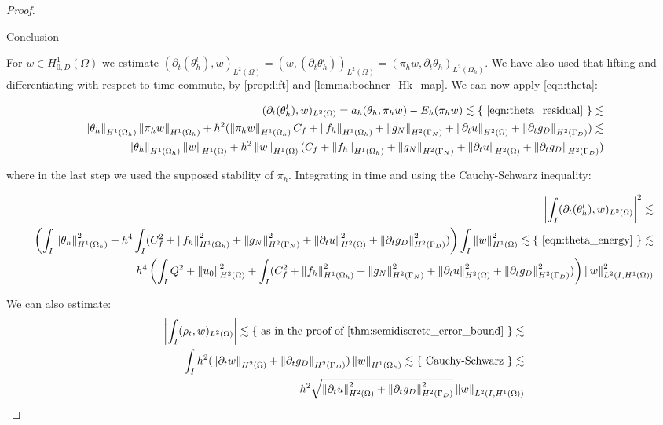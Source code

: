\documentclass[english,a4paper,9pt,oneside]{scrbook}	%
\theoremstyle{break}
\newenvironment{mproof}[1][\proofname]{%
  \begin{proof}[#1]$ $\par\nobreak\ignorespaces
}{%
  \end{proof}
}
\renewcommand*{\proofname}{Proof}
\theoremstyle{remark}
\newcommand{\norm}[1]{\left\lVert#1\right\rVert}
\newcommand{\ind}[1]{\{\text{ #1 }\}}
\begin{document}
\begin{appendices}
\begin{mproof}
\underline{Conclusion}

For $w \in H^1_{0,D}(\Omega)$ we estimate $(\partial_t(\theta_h^l), w)_{L^2(\Omega)} = (w, (\partial_t\theta_h^l))_{L^2(\Omega)} =  (\pi_h w,\partial_t\theta_h)_{L^2(\Omega_h)}$. We have also used that lifting and differentiating with respect to time commute, by \cref{prop:lift} and \cref{lemma:bochner_Hk_map}. We can now apply \cref{eqn:theta}:

\begin{align*}
	(\partial_t(\theta_h^l), w)_{L^2(\Omega)} = a_h(\theta_h, \pi_h w) - E_h(\pi_h w ) \lesssim \ind{\cref{eqn:theta_residual}}\lesssim\\
	\norm{\theta_h}_{H^1(\Omega_h)} \norm{\pi_h w}_{H^1(\Omega_h)} + h^2 (\norm{\pi_h w }_{H^1(\Omega_h)} C_f + \norm{f_h}_{H^1(\Omega_h)} + \norm{g_N}_{H^2(\Gamma_N)} + \norm{\partial_t u}_{H^2(\Omega)} + \norm{\partial_t g_D}_{H^2(\Gamma_D)} ) \lesssim\\
	\norm{\theta_h}_{H^1(\Omega_h)} \norm{ w}_{H^1(\Omega)} + h^2 \norm{w }_{H^1(\Omega)} (C_f + \norm{f_h}_{H^1(\Omega_h)} + \norm{g_N}_{H^2(\Gamma_N)} + \norm{\partial_t u}_{H^2(\Omega)} + \norm{\partial_t g_D}_{H^2(\Gamma_D)} )
\end{align*}

where in the last step we used the supposed stability of $\pi_h$. Integrating in time and using the Cauchy-Schwarz inequality:

\begin{align*}
	\left | \int_I(\partial_t(\theta_h^l), w)_{L^2(\Omega)} \right |^2 \lesssim\\
	\left (\int_I \norm{\theta_h}_{H^1(\Omega_h)}^2+ h^4 \int_I (C_f^2 + \norm{f_h}_{H^1(\Omega_h)}^2 + \norm{g_N}^2_{H^2(\Gamma_N)} + \norm{\partial_t u}^2_{H^2(\Omega)} + \norm{\partial_t g_D}^2_{H^2(\Gamma_D)} )\right) \int_I\norm{ w}_{H^1(\Omega)}^2 \lesssim \ind{\cref{eqn:theta_energy}} \lesssim\\
	h^4 \left (  \int_I Q^2 + \norm{u_0}_{H^2(\Omega)}^2 + \int_I (C_f^2 +\norm{f_h}_{H^1(\Omega_h)}^2 + \norm{g_N}^2_{H^2(\Gamma_N)} + \norm{\partial_t u}^2_{H^2(\Omega)} + \norm{\partial_t g_D}^2_{H^2(\Gamma_D)} )\right) \norm{w}_{L^2(I,H^1(\Omega))}^2
\end{align*}

We can also estimate:
\begin{align*}
\left | \int_I (\rho_t, w)_{L^2(\Omega)}\right |\lesssim \ind{as in the proof of \cref{thm:semidiscrete_error_bound}}\lesssim\\\int_I
h^2 (\norm{\partial_t w}_{H^2(\Omega)} + \norm{\partial_t g_D}_{H^2(\Gamma_D)})\norm{w}_{H^1(\Omega_h)} \lesssim \ind{Cauchy-Schwarz}\lesssim\\
h^2 \sqrt{\norm{\partial_t u}_{H^2(\Omega)}^2 + \norm{\partial_t g_D}_{H^2(\Gamma_D)}^2}\norm{w}_{L^2(I,H^1(\Omega))}
\end{align*}


\end{mproof}
\end{appendices}
\end{document}
